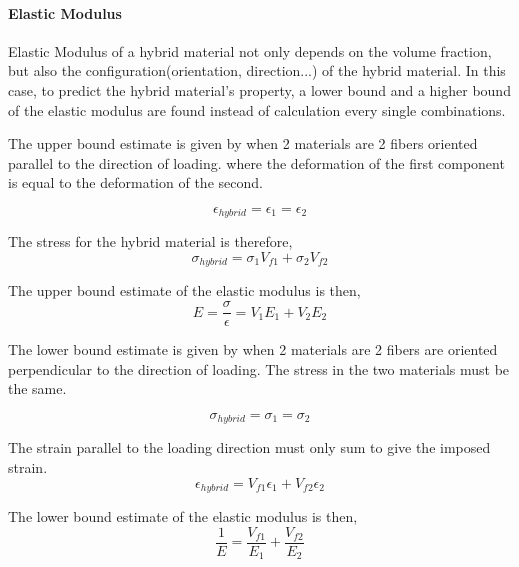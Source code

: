 \documentclass{article}
\begin{document}
    \paragraph*{Elastic Modulus\newline}
    Elastic Modulus of a hybrid material not only depends on the volume fraction, but also the 
    configuration(orientation, direction...) of the hybrid material. In this case, to predict 
    the hybrid material's property, a lower bound and a higher bound of the elastic modulus are found
    instead of calculation every single combinations.
    \vspace{1em}

    \noindent The upper bound estimate is given by when 2 materials are 2 fibers oriented parallel to the direction of loading.
    where the deformation of the first component is equal to the deformation of the second.

    \begin{equation*}
        \epsilon_{hybrid} = \epsilon_{1} = \epsilon_{2} 
    \end{equation*}

    \noindent The stress for the hybrid material is therefore,
    \begin{equation*}
        \sigma_{hybrid} = \sigma_{1}V_{f1} + \sigma_{2}V_{f2}
    \end{equation*}

    \noindent The upper bound estimate of the elastic modulus is then,
    \begin{equation*}
        E = \frac{\sigma}{\epsilon}= V_{1}E_{1} + V_{2}E_{2}
    \end{equation*}


    \noindent The lower bound estimate is given by when 2 materials are 2 fibers are oriented perpendicular to the direction of loading.
    The stress in the two materials must be the same.

    \begin{equation*}
        \sigma_{hybrid} = \sigma_{1} = \sigma_{2}
    \end{equation*}

    \noindent The strain parallel to the loading direction must only sum to give the imposed strain.
    \begin{equation*}
        \epsilon_{hybrid} = V_{f1}\epsilon_{1} + V_{f2}\epsilon_{2}
    \end{equation*}

    \noindent The lower bound estimate of the elastic modulus is then,
    \begin{equation*}
        \frac{1}{E} = \frac{V_{f1}}{E_{1}} + \frac{V_{f2}}{E_{2}}
    \end{equation*}
\end{document}
